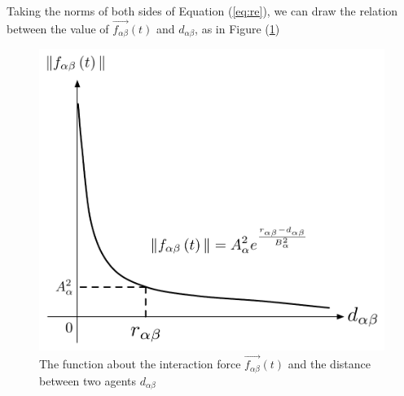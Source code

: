 Taking the norms of both sides of Equation (\ref{eq:re}), we can draw the relation between the value of 
$\overrightarrow{f_{\alpha\beta}}(t)$ and $d_{\alpha \beta}$, as in Figure (\ref{fig:physicalinteraction})
\\
\begin{figure}
\centering
\includegraphics[scale=0.45]{Figures/physicalinteraction.pdf} 
\caption{The function about the interaction force $\vec{f_{\alpha\beta}}(t)$ and the distance between two agents
$d_{\alpha\beta}$ }\label{fig:physicalinteraction}
\end{figure}


